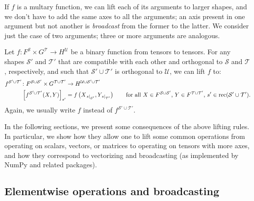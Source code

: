 If $f$ is a multary function, we can lift each of its arguments to larger shapes, and we don't have to add the same axes to all the arguments; an axis present in one argument but not another is \emph{broadcast} from the former to the latter. We consider just the case of two arguments; three or more arguments are analogous. 
\begin{definition} \label{def:lifting2}
Let $f \colon F^{\mathcal{S}} \times G^{\mathcal{T}} \rightarrow H^{\mathcal{U}}$ be a binary function from tensors to tensors. For any shapes $\mathcal{S'}$ and $\mathcal{T'}$ that are compatible with each other and orthogonal to $\mathcal{S}$ and $\mathcal{T}$, respectively, and such that $\mathcal{S'} \cup \mathcal{T'}$ is orthogonal to $\mathcal{U}$, we can lift $f$ to:
\begin{align*}
f^{\mathcal{S'} \cup \mathcal{T'}} \colon F^{\mathcal{S} \cup \mathcal{S'}} \times G^{\mathcal{T} \cup \mathcal{T'}} &\rightarrow H^{\mathcal{U} \cup \mathcal{S'} \cup \mathcal{T'}} \\
  \left[f^{\mathcal{S'} \cup \mathcal{T'}}(X,Y)\right]_{s'} &= f\left(X_{\mathopen{}\left.s\right|_{\mathcal{S'}}},Y_{\mathopen{}\left.s\right|_{\mathcal{T'}}}\right) \qquad \text{for all $X \in F^{\mathcal{S} \cup \mathcal{S'}}$, $Y \in F^{\mathcal{T} \cup \mathcal{T'}}$, $s' \in \operatorname{rec} (\mathcal{S'} \cup \mathcal{T'})$.}
\end{align*}
Again, we usually write $f$ instead of $f^{\mathcal{S'} \cup \mathcal{T'}}$.
\end{definition}

In the following sections, we present some consequences of the above lifting rules. In particular, we show how they allow one to lift some common operations from operating on scalars, vectors, or matrices to operating on tensors with more axes, and how they correspond to vectorizing and broadcasting (as implemented by NumPy and related packages).

\subsection{Elementwise operations and broadcasting}


